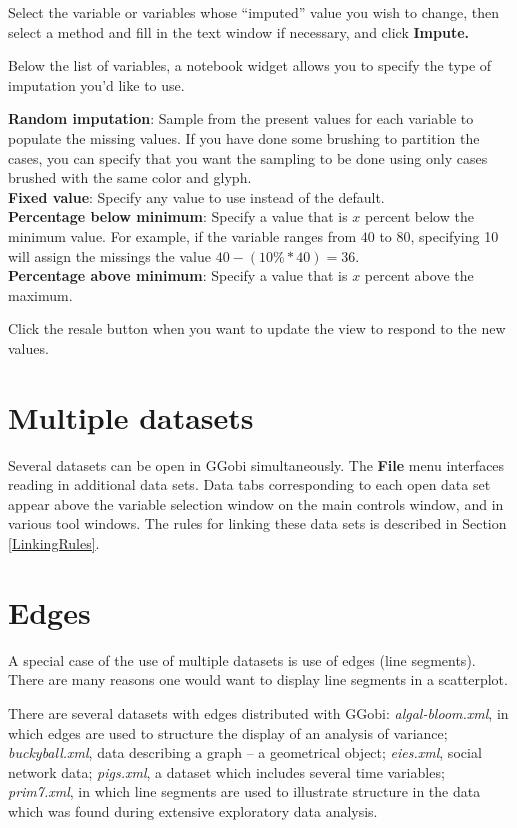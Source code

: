 \documentclass[11pt]{article}
\begin{document}
Select the variable or variables whose ``imputed'' value you
wish to change, then select a method and fill in the text window
if necessary, and click {\bf Impute.}

Below the list of variables, a notebook widget allows you to specify
the type of imputation you'd like to use.

{\bf Random imputation}: Sample from the present values for each variable
  to populate the missing values.  If you have done some brushing to
  partition the cases, you can specify that you want the sampling to be
  done using only cases brushed with the same color and glyph.
\\{\bf Fixed value}: Specify any value to use instead of the default.
\\{\bf Percentage below minimum}: Specify a value that is $x$ percent
  below the minimum value.  For example, if the variable ranges from
 $40$ to $80$, specifying 10 will assign the missings the value $40 - (10\%
 * 40) = 36$.
\\{\bf Percentage above minimum}: Specify a value that is $x$ percent
above the maximum.

Click the resale button when you want to update the view to
respond to the new values.

%
%

\section{Multiple datasets}

Several datasets can be open in GGobi simultaneously. The {\bf File}
menu interfaces reading in additional data sets. Data tabs corresponding
to each open data set appear above the variable selection window on
the main controls window, and in various tool windows. The rules for
linking these data sets is described in Section \ref{LinkingRules}.

\section{Edges}

A special case of the use of multiple datasets is use of edges (line
segments).  There are many reasons one would want to display line segments
in a scatterplot. 

There are several datasets with edges distributed with GGobi: {\em
algal-bloom.xml}, in which edges are used to structure the display of an
analysis of variance; {\em buckyball.xml}, data describing a graph -- a
geometrical object; {\em eies.xml}, social network data; {\em pigs.xml},
a dataset which includes several time variables; {\em prim7.xml},
in which line segments are used to illustrate structure in the
data which was found during extensive exploratory data analysis.
\end{document}
